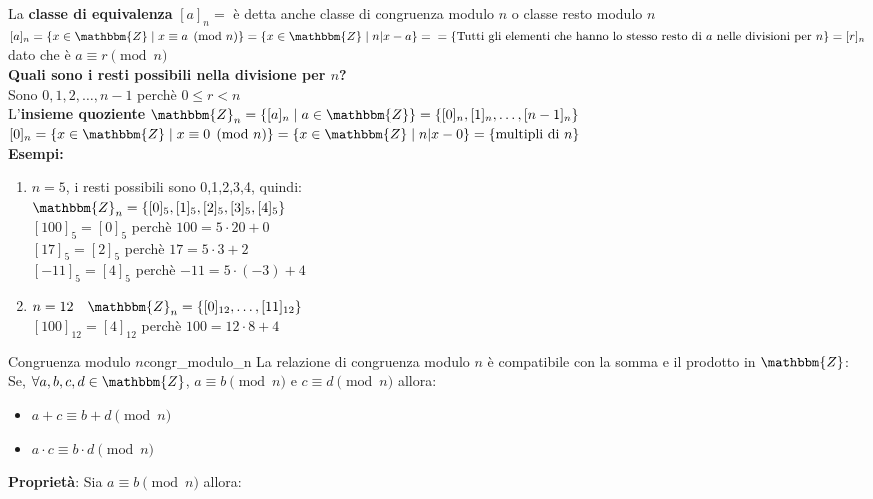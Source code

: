 \documentclass[12pt, letterpaper]{report}
\newcounter{theorem}
\newcommand{\nmu}{}
\begin{document}
		La \textbf{classe di equivalenza} $[a]_n = $ è detta anche classe di congruenza modulo $n$ o classe resto modulo $n$ \\
		$[a]_n = \{x \in \mathbbm{Z} \mid x \equiv a \pmod{n}\} = \{x \in \mathbbm{Z} \mid n|x-a\} = \\ = \{\text{Tutti gli elementi che hanno lo stesso resto di $a$ nelle divisioni per $n$}\} = [r]_n$ dato che è $a \equiv r \pmod{n}$ \\
		\textbf{Quali sono i resti possibili nella divisione per $n$?} \\
		Sono $0, 1, 2, \dots, n - 1$ perchè $0 \leq r < n$ \\
		L'\textbf{insieme quoziente} $\mathbbm{Z}_n = \{[a]_n \mid a \in \mathbbm{Z}\} = \{[0]_n, [1]_n, \dots, [n -1]_n\}$ \\
		$[0]_n = \{x \in \mathbbm{Z} \mid x \equiv 0 \pmod{n}\} = \{x \in \mathbbm{Z} \mid n | x - 0\} = \{\text{multipli di $n$}\}$ \\
		\textbf{Esempi:}
		\begin{enumerate}
			\item $n = 5$, i resti possibili sono 0,1,2,3,4, quindi: \\
			$\mathbbm{Z}_n = \{[0]_5, [1]_5, [2]_5, [3]_5, [4]_5\}$ \\
			$[100]_5 = [0]_5$ perchè $100 = 5\cdot 20 + 0$ \\
			$[17]_5 = [2]_5$ perchè $17 = 5 \cdot 3 + 2$ \\
			$[-11]_5 = [4]_5$ perchè $-11 = 5 \cdot (-3) + 4$
			\item $n = 12 \quad \mathbbm{Z}_n = \{[0]_{12}, \dots, [11]_{12}\}$ \\
			$[100]_{12} = [4]_{12}$ perchè $100 = 12 \cdot 8 + 4$
		\end{enumerate}
		\begin{theorem}{\nmu Congruenza modulo $n$}{congr_modulo_n}
			La relazione di congruenza modulo $n$ è compatibile con la somma e il prodotto in $\mathbbm{Z}$: \\
			Se, $\forall a,b,c,d \in \mathbbm{Z}$, $a \equiv b \pmod{n}$ e $c \equiv d \pmod{n}$ allora:
			\begin{itemize}
				\item $a + c \equiv b + d \pmod{n}$
				\item $a \cdot c \equiv b \cdot d \pmod{n}$
			\end{itemize}

		\end{theorem}
		\textbf{Proprietà}: Sia $a \equiv b \pmod{n}$ allora:
\end{document}
